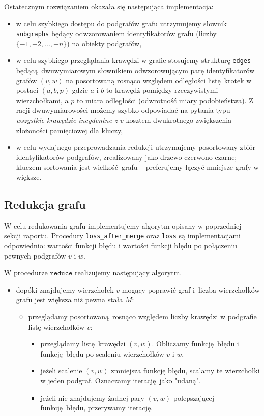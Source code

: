 \documentclass[a4paper,10pt]{article}
\begin{document}
Ostatecznym rozwiązaniem okazała się następująca implementacja:
\begin{itemize}
 \item w celu szybkiego dostępu do podgrafów grafu utrzymujemy słownik \texttt{subgraphs} będący odwzorowaniem identyfikatorów grafu (liczby $\{-1, -2, ..., -n\}$) na obiekty podgrafów,
 \item w celu szybkiego przeglądania krawędzi w grafie stosujemy strukturę \texttt{edges} będącą dwuwymiarowym słownikiem odwzorowującym parę identyfikatorów grafów $\left(v, w\right)$ na posortowaną rosnąco względem odległości listę krotek w postaci $\left(a, b, p\right)$ gdzie $a$ i $b$ to krawędź pomiędzy rzeczywistymi wierzchołkami, a $p$ to miara odległości (odwrotność miary podobieństwa). Z racji dwuwymiarowości możemy szybko odpowiadać na pytania typu \textit{wszystkie krawędzie incydentne z $v$} kosztem dwukrotnego zwiększenia złożoności pamięciowej dla kluczy,
 \item w celu wydajnego przeprowadzania redukcji utrzymujemy posortowany zbiór identyfikatorów podgrafów, zrealizowany jako drzewo czerwono-czarne; kluczem sortowania jest wielkość grafu -- preferujemy łączyć mniejsze grafy w większe.
\end{itemize}

\subsection{Redukcja grafu}

W celu redukowania grafu implementujemy algorytm opisany w poprzedniej sekcji raportu. Procedury \texttt{loss\_after\_merge} oraz \texttt{loss} są implementacjami odpowiednio: wartości funkcji błędu i wartości funkcji błędu po połączeniu pewnych podgrafów $v$ i $w$.

W procedurze $\texttt{reduce}$ realizujemy następujący algorytm.
\begin{itemize}
 \item dopóki znajdujemy wierzchołek $v$ mogący poprawić graf i liczba wierzchołków grafu jest większa niż pewna stała $M$:
  \begin{itemize}
    \item przeglądamy posortowaną rosnąco względem liczby krawędzi w podgrafie listę wierzchołków $v$:
    \begin{itemize}
    \item przeglądamy listę krawędzi $\left(v, w\right)$. Obliczamy funkcję błędu i funkcję błędu po scaleniu wierzchołków $v$ i $w$,
    \item jeżeli scalenie $\left(v, w\right)$ zmniejsza funkcję błędu, scalamy te wierzchołki w jeden podgraf. Oznaczamy iterację jako "udaną",
    \item jeżeli nie znajdujemy żadnej pary $\left(v, w\right)$ polepszającej funkcję błędu, przerywamy iterację.
    \end{itemize}
  \end{itemize}
\end{itemize}
\end{document}
